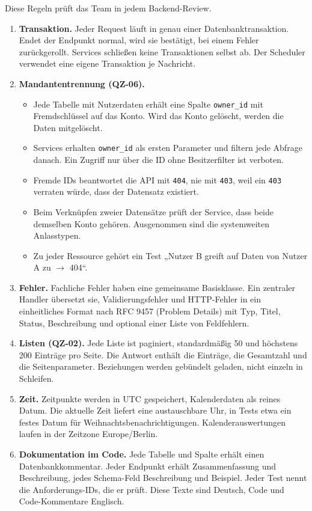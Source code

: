 \documentclass[11pt,a4paper]{article}
\begin{document}
Diese Regeln prüft das Team in jedem Backend-Review.

\begin{enumerate}
\item \textbf{Transaktion.} Jeder Request läuft in genau einer Datenbanktransaktion. Endet der Endpunkt normal, wird sie bestätigt, bei einem Fehler zurückgerollt. Services schließen keine Transaktionen selbst ab. Der Scheduler verwendet eine eigene Transaktion je Nachricht.
\item \textbf{Mandantentrennung (QZ-06).}
\begin{itemize}
\item Jede Tabelle mit Nutzerdaten erhält eine Spalte \texttt{owner\_\allowbreak{}id} mit Fremdschlüssel auf das Konto. Wird das Konto gelöscht, werden die Daten mitgelöscht.
\item Services erhalten \texttt{owner\_\allowbreak{}id} als ersten Parameter und filtern jede Abfrage danach. Ein Zugriff nur über die ID ohne Besitzerfilter ist verboten.
\item Fremde IDs beantwortet die API mit \texttt{404}, nie mit \texttt{403}, weil ein \texttt{403} verraten würde, dass der Datensatz existiert.
\item Beim Verknüpfen zweier Datensätze prüft der Service, dass beide demselben Konto gehören. Ausgenommen sind die systemweiten Anlasstypen.
\item Zu jeder Ressource gehört ein Test „Nutzer B greift auf Daten von Nutzer A zu $\rightarrow$ 404“.
\end{itemize}

\item \textbf{Fehler.} Fachliche Fehler haben eine gemeinsame Basisklasse. Ein zentraler Handler übersetzt sie, Validierungsfehler und HTTP-Fehler in ein einheitliches Format nach RFC 9457 (Problem Details) mit Typ, Titel, Status, Beschreibung und optional einer Liste von Feldfehlern.
\item \textbf{Listen (QZ-02).} Jede Liste ist paginiert, standardmäßig 50 und höchstens 200 Einträge pro Seite. Die Antwort enthält die Einträge, die Gesamtzahl und die Seitenparameter. Beziehungen werden gebündelt geladen, nicht einzeln in Schleifen.
\item \textbf{Zeit.} Zeitpunkte werden in UTC gespeichert, Kalenderdaten als reines Datum. Die aktuelle Zeit liefert eine austauschbare Uhr, in Tests etwa ein festes Datum für Weihnachtsbenachrichtigungen. Kalenderauswertungen laufen in der Zeitzone Europe/Berlin.
\item \textbf{Dokumentation im Code.} Jede Tabelle und Spalte erhält einen Datenbankkommentar. Jeder Endpunkt erhält Zusammenfassung und Beschreibung, jedes Schema-Feld Beschreibung und Beispiel. Jeder Test nennt die Anforderungs-IDs, die er prüft. Diese Texte sind Deutsch, Code und Code-Kommentare Englisch.
\end{enumerate}
\end{document}
